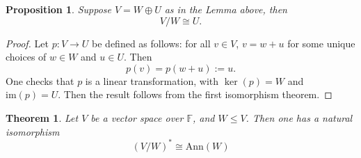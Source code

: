 \documentclass[11pt,openany]{book}
\theoremstyle{plain}
\newtheorem{theorem}{Theorem}[chapter]
\newtheorem{proposition}[proposition]{Proposition}
\theoremstyle{definition}
\theoremstyle{remark}
\begin{document}
\begin{proposition}
    Suppose $V = W \oplus U$ as in the Lemma above, then
    $$V/W \cong U.$$
\end{proposition}
\begin{proof}
    Let $p: V \to U$ be defined as follows: for all $v \in V$, $v = w + u$ for some unique choices of $w \in W$ and $u \in U$. Then
    $$p(v) = p(w+u) := u.$$
    One checks that $p$ is a linear transformation, with $\ker(p) = W$ and $\mathrm{im}(p) = U$. Then the result follows from the first isomorphism theorem.
\end{proof}

\begin{theorem}
    Let $V$ be a vector space over $\mathbb{F}$, and $W \leq V$. Then one has a natural isomorphism 
    $$(V/W)^* \cong \mathrm{Ann}(W)$$
\end{theorem}
\end{document}
